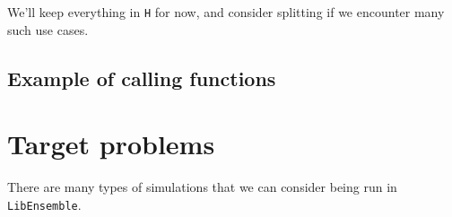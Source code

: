 \documentclass{article}
\newcommand{\libE}{\texttt{LibEnsemble}}
\begin{document}
We'll keep everything in \texttt{H} for now, and consider splitting if we
encounter many such use cases.

\clearpage
\subsection{Example of calling functions}


\clearpage


\clearpage
\section{Target problems}
There are many types of simulations that we can consider being run in \libE.
\end{document}
